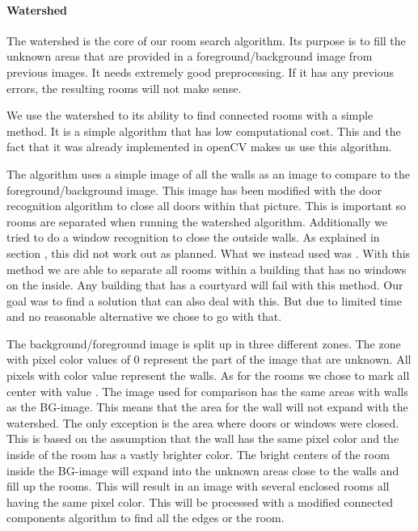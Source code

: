  
\paragraph{Watershed}
\label{subsubsub:watershed}

The watershed is the core of our room search algorithm. Its purpose is to fill  the unknown areas that are provided in a foreground/background image from previous images. It needs extremely good preprocessing. If it has any previous errors, the resulting rooms will not make sense.

We use the watershed to its ability to find connected rooms with a simple method. It is a simple algorithm that has low computational cost. This and the fact that it was already implemented in openCV makes us use this algorithm.

The algorithm uses a simple image of all the walls as an image to compare to the foreground/background image. This image has been modified with the door recognition algorithm to close all doors within that picture. This is important so rooms are separated when running the watershed algorithm. Additionally we tried to do a window recognition to close the outside walls. As explained in section , this did not work out as planned. What we instead used was . With this method we are able to separate all rooms within a building that has no windows on the inside. Any building that has a courtyard will fail with this method. Our goal was to find a solution that can also deal with this. But due to limited time and no reasonable alternative we chose to go with that.

The background/foreground image is split up in three different zones. The zone with pixel color values of 0 represent the part of the image that are unknown. All pixels with color value  represent the walls. As for the rooms we chose to mark all center with value . The image used for comparison has the same areas with walls as the BG-image. This means that the area for the wall will not expand with the watershed. The only exception is the area where doors or windows were closed. This is based on the assumption that the wall has the same pixel color and the inside of the room has a vastly brighter color.
The bright centers of the room inside the BG-image will expand into the unknown areas close to the walls and fill up the rooms. This will result in an image with several enclosed rooms all having the same pixel color. This will be processed with a modified connected components algorithm to find all the edges or the room.

